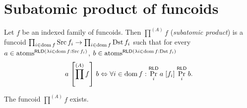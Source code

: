 \section{Subatomic product of funcoids}
\begin{defn}
Let $f$ be an indexed family of funcoids.
Then $\prod^{(A)}f$ (\emph{subatomic product}) is a funcoid $\prod_{i\in\operatorname{dom} f}\operatorname{Src} f_{i}\rightarrow\prod_{i\in\operatorname{dom} f}\operatorname{Dst} f_{i}$
such that for every $a\in\operatorname{atoms}^{\mathsf{RLD}(\lambda i\in\operatorname{dom} f:\operatorname{Src} f_{i})}$,
$b\in\operatorname{atoms}^{\mathsf{RLD}(\lambda i\in\operatorname{dom} f:\operatorname{Dst} f_{i})}$
\[
a\mathrel{\left[\prod^{(A)}f\right]}b\Leftrightarrow\forall i\in\operatorname{dom} f:\Pr_{i}^{\mathsf{RLD}}a\mathrel{\left[f_{i}\right]}\Pr_{i}^{\mathsf{RLD}}b.
\]
\end{defn}
\begin{prop}
The funcoid $\prod^{(A)}f$ exists.\end{prop}
